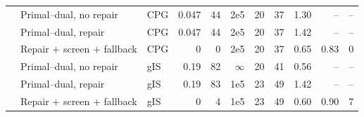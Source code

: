 \begin{tabular}{@{}lllrrrrrrrr@{}}
 & Primal--dual, no repair & CPG & 0.047 & 44 & 2e5 & 20 & 37 & 1.30 & -- & -- \\
 & Primal--dual, repair & CPG & 0.047 & 44 & 2e5 & 20 & 37 & 1.42 & -- & -- \\
 & Repair + screen + fallback & CPG & 0 & 0 & 2e5 & 20 & 37 & 0.65 & 0.83 & 0 \\
 & Primal--dual, no repair & gIS & 0.19 & 82 & $\infty$ & 20 & 41 & 0.56 & -- & -- \\
 & Primal--dual, repair & gIS & 0.19 & 83 & 1e5 & 23 & 49 & 1.42 & -- & -- \\
 & Repair + screen + fallback & gIS & 0 & 4 & 1e5 & 23 & 49 & 0.60 & 0.90 & 7 \\
\bottomrule
\end{tabular}
